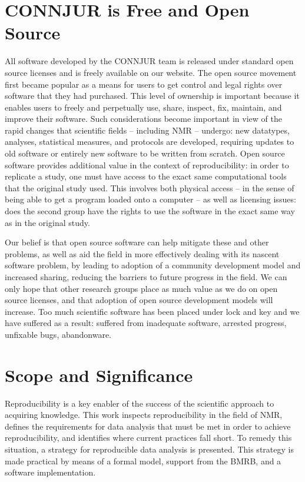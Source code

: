 \section{CONNJUR is Free and Open Source}
All software developed by the CONNJUR team is released under standard open 
source licenses and is freely available on our website.  The open source 
movement first became popular as a means for users to get control and legal 
rights over software that they had purchased.  This level of ownership is 
important because it enables users to freely and perpetually use, share, 
inspect, fix, maintain, and improve their software.  Such considerations 
become important in view of the rapid changes that scientific fields -- 
including NMR -- undergo: new datatypes, analyses, statistical measures, 
and protocols are developed, requiring updates to old software or entirely 
new software to be written from scratch.  Open source software provides 
additional value in the context of reproducibility: in order to replicate a
study, one must have access to the exact same computational tools that the 
original study used.  This involves both physical access -- in the sense of 
being able to get a program loaded onto a computer -- as well as licensing 
issues: does the second group have the rights to use the software in the 
exact same way as in the original study.

Our belief is that open source software can help mitigate these and other 
problems, as well as aid the field in more effectively dealing with its 
nascent software problem, by leading to adoption of a community development 
model and increased sharing, reducing the barriers to future progress in 
the field.  We can only hope that other research groups place as much value 
as we do on open source licenses, and that adoption of open source development 
models will increase.  Too much scientific software has been placed under lock 
and key and we have suffered as a result: suffered from inadequate software, 
arrested progress, unfixable bugs, abandonware.


\section{Scope and Significance}
Reproducibility is a key enabler of the success of the scientific approach to 
acquiring knowledge.  This work inspects reproducibility in the field of NMR, 
defines the requirements for data analysis that must be met in order to achieve 
reproducibility, and identifies where current practices fall short.  To remedy 
this situation, a strategy for reproducible data analysis is presented.  This 
strategy is made practical by means of a formal model, support from the BMRB, 
and a software implementation.

